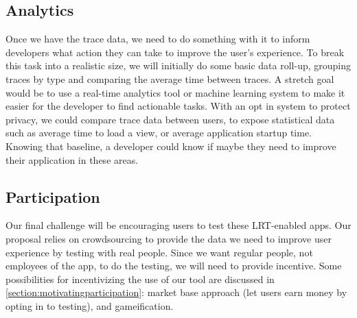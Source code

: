 \subsection{Analytics}
Once we have the trace data, we need to do something with it to inform developers
what action they can take to improve the user's experience. To break this task
into a realistic size, we will initially do some basic data roll-up, grouping
traces by type and comparing the average time between traces. A stretch goal
would be to use a real-time analytics tool or machine learning system 
to make it easier for the developer to find actionable tasks. With 
an opt in system to protect privacy, we could compare trace data between users,
to expose statistical data such as average time to load a view, or average 
application startup time. Knowing that baseline, a developer could know 
if maybe they need to improve their application in these areas.


\subsection{Participation}
Our final challenge will be encouraging users to test these LRT-enabled apps. Our
proposal relies on crowdsourcing to provide the data we need to improve user
experience by testing with real people. Since we want regular people, not employees
of the app, to do the testing, we will need to provide incentive. Some possibilities
for incentivizing the use of our tool are discussed in \ref{section:motivatingparticipation}:
market base approach (let users earn money by opting in to testing), and gameification.


